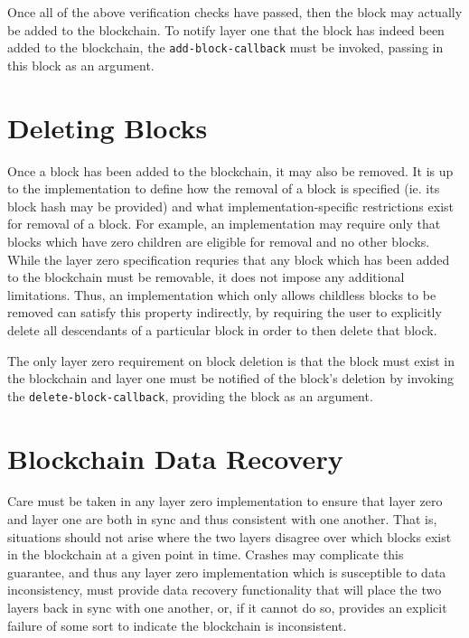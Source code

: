 \documentclass[12pt]{article}
\begin{document}
Once all of the above verification checks have passed, then the block may actually be added to the blockchain. To notify layer one that the block has indeed been added to the blockchain, the \texttt{add-block-callback} must be invoked, passing in this block as an argument.

\section{Deleting Blocks}
Once a block has been added to the blockchain, it may also be removed. It is up to the implementation to define how the removal of a block is specified (ie. its block hash may be provided) and what implementation-specific restrictions exist for removal of a block. For example, an implementation may require only that blocks which have zero children are eligible for removal and no other blocks. While the layer zero specification requries that any block which has been added to the blockchain must be removable, it does not impose any additional limitations. Thus, an implementation which only allows childless blocks to be removed can satisfy this property indirectly, by requiring the user to explicitly delete all descendants of a particular block in order to then delete that block.

The only layer zero requirement on block deletion is that the block must exist in the blockchain and layer one must be notified of the block's deletion by invoking the \texttt{delete-block-callback}, providing the block as an argument.

\section{Blockchain Data Recovery}
Care must be taken in any layer zero implementation to ensure that layer zero and layer one are both in sync and thus consistent with one another. That is, situations should not arise where the two layers disagree over which blocks exist in the blockchain at a given point in time. Crashes may complicate this guarantee, and thus any layer zero implementation which is susceptible to data inconsistency, must provide data recovery functionality that will place the two layers back in sync with one another, or, if it cannot do so, provides an explicit failure of some sort to indicate the blockchain is inconsistent.
\end{document}
